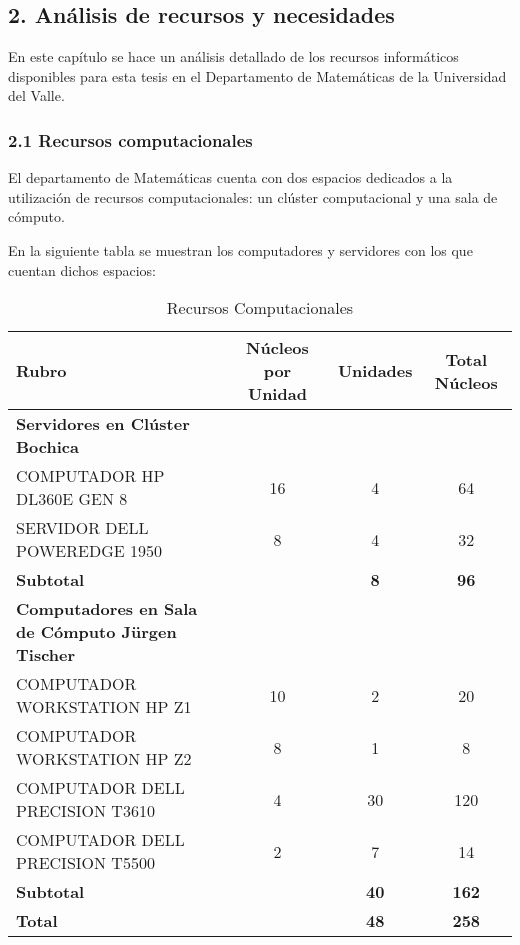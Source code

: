 \begin{spacing}{1.5}
    \begin{tightcenter}
      \section{2. Análisis de recursos y necesidades}
      \mylinespacing
    \end{tightcenter}

  En este capítulo se hace un análisis detallado de los recursos informáticos disponibles para esta tesis en el Departamento de Matemáticas de la Universidad del Valle.

  \subsubsection{2.1 Recursos computacionales}
  El departamento de Matemáticas cuenta con dos espacios dedicados a la utilización de recursos computacionales: un clúster computacional y una sala de cómputo.

  En la siguiente tabla se muestran los computadores y servidores con los que cuentan dichos espacios:
  \vspace{3mm}

  \begin{table}[h!]
    \centering
    \begin{tabular}{p{5cm}|c|c|c}
    \hline
    \textbf{Rubro} & \textbf{Núcleos por Unidad} & \textbf{Unidades} & \textbf{Total Núcleos} \\ \hline
    \textbf{Servidores en Clúster Bochica} &  &  &  \\ \hline
    COMPUTADOR HP DL360E GEN 8 & 16 & 4 & 64 \\ \hline
    SERVIDOR DELL POWEREDGE 1950 & 8 & 4 & 32 \\ \hline
    \textbf{Subtotal} &  & \textbf{8} & \textbf{96} \\ \hline
    \textbf{Computadores en Sala de Cómputo Jürgen Tischer} &  &  &  \\ \hline
    COMPUTADOR WORKSTATION HP Z1 & 10 & 2 & 20 \\ \hline
    COMPUTADOR WORKSTATION HP Z2 & 8 & 1 & 8 \\ \hline
    COMPUTADOR DELL PRECISION T3610 & 4 & 30 & 120 \\ \hline
    COMPUTADOR DELL PRECISION T5500 & 2 & 7 & 14 \\ \hline
    \textbf{Subtotal} &  & \textbf{40} & \textbf{162} \\ \hline
    \textbf{Total} & \textbf{ } & \textbf{48} & \textbf{258} \\ \hline
    \end{tabular}
    \caption{Recursos Computacionales}
    \label{table:table1}
    \end{table}


\end{spacing}
